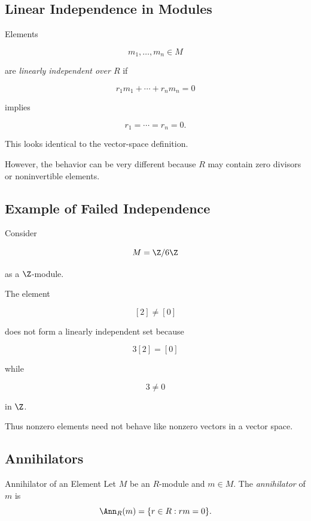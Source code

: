 \subsection{Linear Independence in Modules}
\label{subsec:module-linear-independence}

Elements

\[ m_1,\ldots,m_n\in M \]

are \emph{linearly independent over \(R\)} if

\[ r_1m_1+\cdots+r_nm_n=0 \]

implies

\[ r_1=\cdots=r_n=0. \]

This looks identical to the vector-space definition.

However, the behavior can be very different because \(R\) may contain zero
divisors or noninvertible elements.

\subsection{Example of Failed Independence}
\label{subsec:failed-module-independence}

Consider

\[ M=\Z/6\Z \]

as a \(\Z\)-module.

The element

\[ [2]\neq[0] \]

does not form a linearly independent set because

\[ 3[2]=[0] \]

while

\[ 3\neq0 \]

in \(\Z\).

Thus nonzero elements need not behave like nonzero vectors in a vector space.

\subsection{Annihilators}
\label{subsec:annihilators}

\begin{definitionbox}{Annihilator of an Element}
Let \(M\) be an \(R\)-module and \(m\in M\). The \emph{annihilator} of \(m\)
is
\[ \Ann_R(m)=\{r\in R:rm=0\}. \]
\end{definitionbox}

